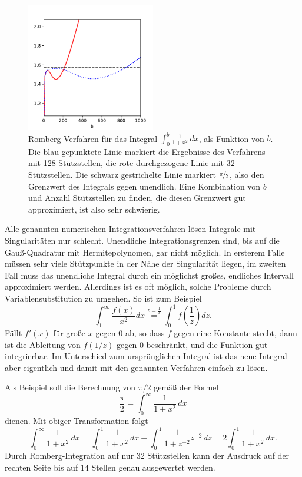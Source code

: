 \begin{figure}
  \centering
  \includegraphics[width=0.5\textwidth]{plots/inf_int}
  \caption{Romberg-Verfahren für das Integral $\int_0^{b}
    \frac{1}{1+x^2}\, dx$, als Funktion von $b$. Die blau gepunktete
    Linie markiert die Ergebnisse des Verfahrens mit 128 Stützstellen,
    die rote durchgezogene Linie mit 32 Stützstellen. Die schwarz
    gestrichelte Linie markiert $\nicefrac{\pi}{2}$, also den
    Grenzwert des Integrals gegen unendlich. Eine Kombination von $b$
    und Anzahl Stützstellen zu finden, die diesen Grenzwert gut
    approximiert, ist also sehr schwierig.}
  \label{fig:inf_int}
\end{figure}

Alle genannten numerischen Integrationsverfahren lösen Integrale mit
Singularitäten nur schlecht. Unendliche Integrationsgrenzen sind, bis
auf die Gauß-Quadratur mit Hermitepolynomen, gar nicht möglich. In
ersterem Falle müssen sehr viele Stützpunkte in der Nähe der
Singularität liegen, im zweiten Fall muss das unendliche Integral
durch ein möglichst großes, endliches Intervall approximiert
werden. Allerdings ist es oft möglich, solche Probleme durch
Variablensubstitution zu umgehen.  So ist zum Beispiel
\begin{equation}
  \int_1^{\infty} \frac{f(x)}{x^2}dx \stackrel{z = \frac{1}{x}}{=}
  \int_0^1 f\left(\frac{1}{z}\right)dz.
\end{equation}
Fällt $f'(x)$ für große $x$ gegen $0$ ab, so dass $f$ gegen eine
Konstante strebt, dann ist die Ableitung von $f(1/z)$ gegen $0$
beschränkt, und die Funktion gut integrierbar. Im Unterschied zum
ursprünglichen Integral ist das neue Integral aber eigentlich und
damit mit den genannten Verfahren einfach zu lösen.

Als Beispiel soll die Berechnung von $\pi/2$ gemäß der Formel
\begin{equation}
  \frac{\pi}{2} = \int_0^{\infty} \frac{1}{1+x^2}\, dx
\end{equation}
dienen. Mit obiger Transformation folgt
\begin{equation}
  \int_0^{\infty} \frac{1}{1+x^2}\, dx
  = \int_0^1 \frac{1}{1+x^2}\, dx +  \int_0^1 \frac{1}{1+z^{-2}}z^{-2}\, dz
  = 2\int_0^1 \frac{1}{1+x^2}\, dx.
\end{equation}
Durch Romberg-Integration auf nur 32 Stützstellen kann der Ausdruck
auf der rechten Seite bis auf 14 Stellen genau ausgewertet
werden.


